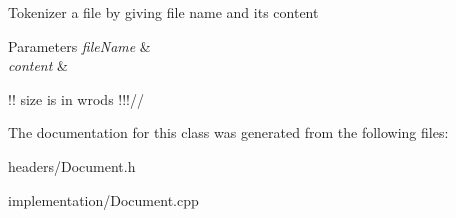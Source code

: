 Tokenizer a file by giving file name and its content 
\begin{DoxyParams}{Parameters}
{\em file\+Name} & \\
\hline
{\em content} & \\
\hline
\end{DoxyParams}
!! size is in wrods !!!// 

The documentation for this class was generated from the following files\+:\begin{DoxyCompactItemize}
\item 
headers/Document.\+h\item 
implementation/Document.\+cpp\end{DoxyCompactItemize}
